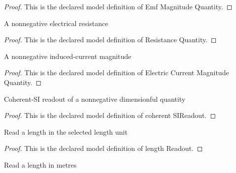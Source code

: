 \begin{proof}
  This is the declared model definition of Emf Magnitude Quantity.
\end{proof}
\begin{definition}
  \label{def:physics:phyx-mini-0973:phyxminiproblems-problemphyxmini0973-resistancequantity}
  A nonnegative electrical resistance
\end{definition}
\begin{proof}
  This is the declared model definition of Resistance Quantity.
\end{proof}
\begin{definition}
  \label{def:physics:phyx-mini-0973:phyxminiproblems-problemphyxmini0973-electriccurrentmagnitudequantity}
  A nonnegative induced-current magnitude
\end{definition}
\begin{proof}
  This is the declared model definition of Electric Current Magnitude Quantity.
\end{proof}
\begin{definition}
  \label{def:physics:phyx-mini-0973:phyxminiproblems-problemphyxmini0973-coherentsireadout}
  Coherent-SI readout of a nonnegative dimensionful quantity
\end{definition}
\begin{proof}
  This is the declared model definition of coherent SIReadout.
\end{proof}
\begin{definition}
  \label{def:physics:phyx-mini-0973:phyxminiproblems-problemphyxmini0973-lengthreadout}
  Read a length in the selected length unit
\end{definition}
\begin{proof}
  This is the declared model definition of length Readout.
\end{proof}
\begin{definition}
  \label{def:physics:phyx-mini-0973:phyxminiproblems-problemphyxmini0973-lengthinmeters}
  Read a length in metres
\end{definition}
